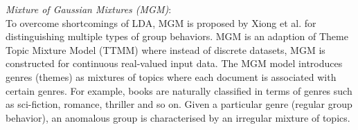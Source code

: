  












{\it Mixture of Gaussian Mixtures (MGM)}:\\
 To overcome shortcomings of LDA, MGM is proposed by   Xiong et al. \cite{MGM} for distinguishing multiple types of group behaviors. %
  MGM is an adaption of  Theme Topic Mixture Model (TTMM) %
  \cite{TTMM}  where instead of discrete datasets, MGM is constructed for continuous real-valued input data.  The MGM model introduces genres (themes) as mixtures of topics where each document is associated with certain genres.   %
  For example, books are naturally classified in terms of genres such as sci-fiction, romance, thriller and so on. Given a particular genre (regular group behavior), an anomalous group is characterised by an irregular mixture of topics.  %


